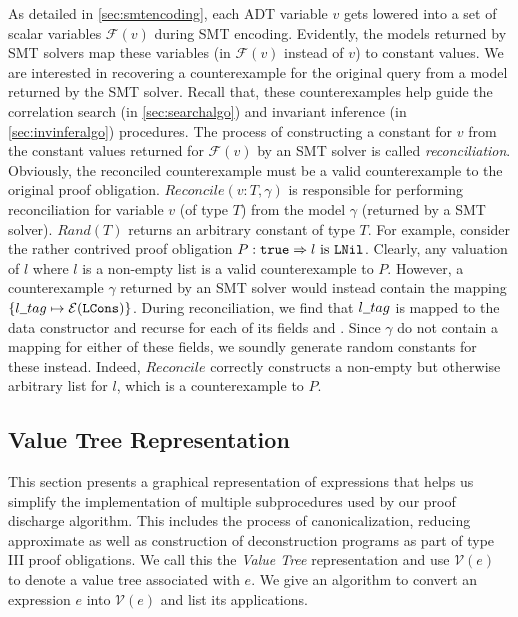 

As detailed in \cref{sec:smtencoding}, each ADT variable $v$ gets lowered into a set of scalar
variables $\mathcal{F}(v)$ during SMT encoding.
Evidently, the models returned by SMT solvers map these variables (in $\mathcal{F}(v)$ instead of $v$)
to constant values.
We are interested in recovering a counterexample for the original query from a
model returned by the SMT solver.
Recall that, these counterexamples help guide the correlation search (in \cref{sec:searchalgo})
and invariant inference (in \cref{sec:invinferalgo}) procedures.
The process of constructing a constant for $v$ from the constant values returned for $\mathcal{F}(v)$
by an SMT solver is called {\em reconciliation}.
Obviously, the reconciled counterexample must be a valid counterexample to the original proof obligation.
$Reconcile(v:T, \gamma)$ is responsible for performing reconciliation for variable $v$ (of type $T$)
from the model $\gamma$ (returned by a SMT solver).
$Rand(T)$ returns an arbitrary constant of type $T$.
For example, consider the rather contrived proof obligation $P: {\tt true} \Rightarrow l\ \mathrm{is}\ {\tt {\tt LNil}}$.
Clearly, any valuation of $l$ where $l$ is a non-empty list is a valid counterexample to $P$.
However, a counterexample $\gamma$ returned by an SMT solver would instead contain
the mapping $\{ l \strsep{} tag \mapsto \mathcal{E}(\cons{LCons}) \}$.
During reconciliation, we find that $l \strsep{} tag$ is mapped to the data constructor 
and recurse for each of its fields  and .
Since $\gamma$ do not contain a mapping for either of these fields, we soundly generate random constants
for these instead.
Indeed, $Reconcile$ correctly constructs a non-empty but otherwise arbitrary list for $l$, which
is a counterexample to $P$.

\subsection{Value Tree Representation}
\label{sec:valuegraph}
This section presents a graphical representation of expressions that helps us simplify the
implementation of multiple subprocedures used by our proof discharge algorithm.
This includes the process of canonicalization, reducing approximate \recursiveRelations{} as well as
construction of deconstruction programs as part of type III proof obligations.
We call this the {\em Value Tree} representation and use $\mathcal{V}(e)$ to denote a value tree associated with $e$.
We give an algorithm to convert an expression $e$ into $\mathcal{V}(e)$ and list its applications.

